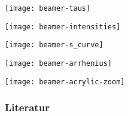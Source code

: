 \documentclass[english, fleqn]{beamer}
\begin{document}
\begin{frame}
    \texttt{[image: beamer-taus]}
\end{frame}


\begin{frame}
    \texttt{[image: beamer-intensities]}
\end{frame}


\begin{frame}
    \texttt{[image: beamer-s\_curve]}
\end{frame}


\begin{frame}
    \texttt{[image: beamer-arrhenius]}
\end{frame}


\begin{frame}
    \texttt{[image: beamer-acrylic-zoom]}
\end{frame}



\begin{frame}
    \frametitle{Literatur}

    \printbibliography
\end{frame}
\end{document}
